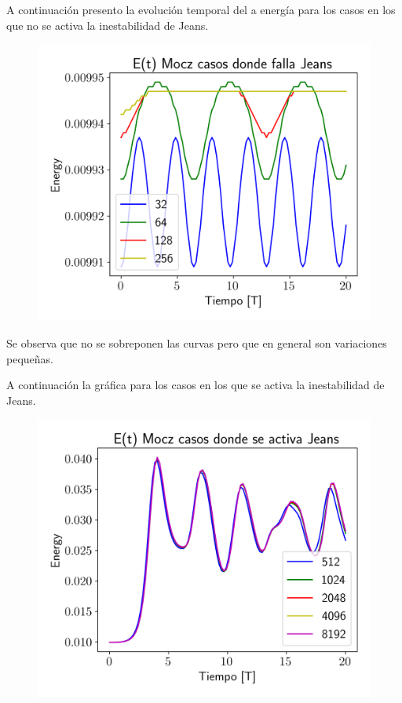 \documentclass[notitlepage,letterpaper,12pt]{article} %
\begin{document}
A continuación presento la evolución temporal del a energía para los casos en los que no se activa la inestabilidad de Jeans.

\begin{figure}[h]
  \centering
   \includegraphics[scale= 0.6]{JeansFails.png}
  \label{fig: cobre}
\end{figure}	

Se observa que no se sobreponen las curvas pero que en general son variaciones pequeñas.
\newpage

A continuación la gráfica para los casos en los que se activa la inestabilidad de Jeans.


\begin{figure}[h]
  \centering
   \includegraphics[scale= 0.6]{JeansActivates.png}
  \label{fig: cobre}
\end{figure}	
\end{document}
